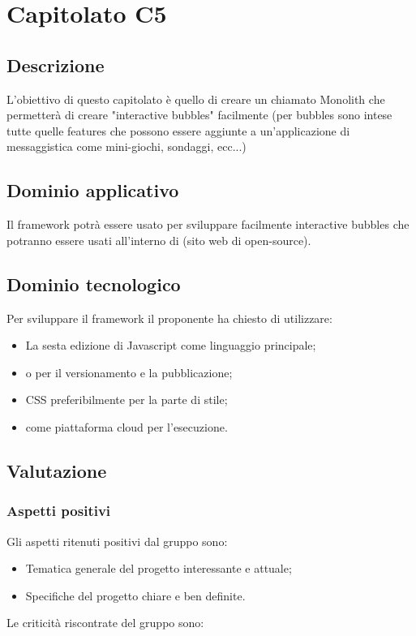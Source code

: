 \documentclass[../StudioDiFattibilita.tex]{subfiles}
\begin{document}
	\section{Capitolato C5}
		\subsection{Descrizione}
		L'obiettivo di questo capitolato è quello di creare un  chiamato Monolith che permetterà di creare "interactive bubbles" facilmente (per bubbles sono intese tutte quelle features che possono essere aggiunte a un'applicazione di messaggistica come mini-giochi, sondaggi, ecc...)   
		\subsection{Dominio applicativo}
		Il framework potrà essere usato per sviluppare facilmente interactive bubbles che potranno essere usati all'interno di  (sito web di  open-source).
		\subsection{Dominio tecnologico}
		Per sviluppare il framework il proponente ha chiesto di utilizzare:
			\begin{itemize}
			\item La sesta edizione di Javascript come linguaggio principale; 
			\item {} o  per il versionamento e la pubblicazione;
			\item CSS preferibilmente per la parte di stile;
			\item {} come piattaforma cloud per l'esecuzione.
			\end{itemize}
		\subsection{Valutazione}
			\subsubsection{Aspetti positivi}
			Gli aspetti ritenuti positivi dal gruppo sono:
				\begin{itemize}
				\item Tematica generale del progetto interessante e attuale;
				\item Specifiche del progetto chiare e ben definite.
				\end{itemize}
			Le criticità riscontrate del gruppo sono:	
\end{document}
